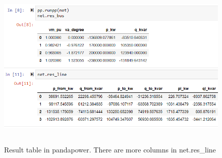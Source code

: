 \documentclass[class=book, crop=false]{standalone}
\begin{document}
\begin{figure}[H]
    \includegraphics[height=8cm, width=14cm]{figures/case4g_line_bus_res.PNG}
    \caption[size = 9]{Result table in pandapower. There are more columns in net.res\_line}
    \label{fig:method:res_line_bus_dataframe}
\end{figure}
\end{document}

